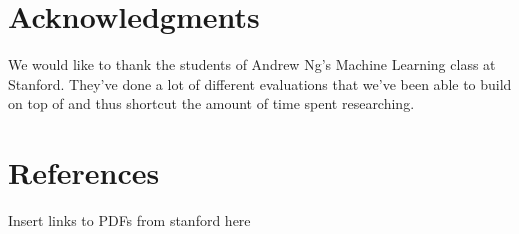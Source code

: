 \documentclass{article}
\begin{document}
%
%
%

 
\section*{Acknowledgments} 
 
 We would like to thank the students of Andrew Ng's Machine Learning class at Stanford. They've done a lot of different evaluations that we've been able to build on top of and thus shortcut the amount of time spent researching.
 
\section*{References} 
 
 Insert links to PDFs from stanford here
 



\end{document}
